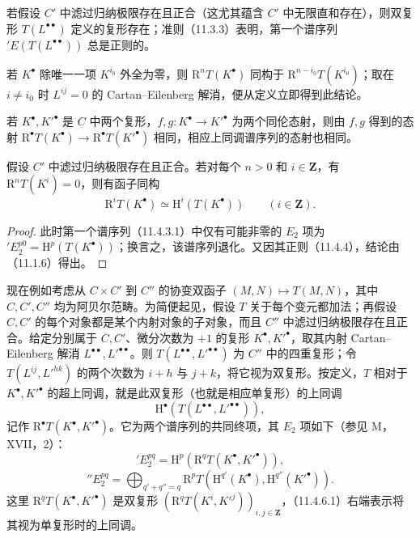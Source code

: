 若假设 $C'$ 中滤过归纳极限存在且正合（这尤其蕴含 $C'$ 中无限直和存在），则双复形 $T(L^{\bullet\bullet})$ 定义的复形存在；准则（11.3.3）表明，第一个谱序列 $'E(T(L^{\bullet\bullet}))$ 总是正则的。

若 $K^\bullet$ 除唯一一项 $K^{i_0}$ 外全为零，则 $\mathrm R^nT(K^\bullet)$ 同构于 $\mathrm R^{n-i_0}T(K^{i_0})$；取在 $i\ne i_0$ 时 $L^{ij}=0$ 的 Cartan--Eilenberg 解消，便从定义立即得到此结论。

若 $K^\bullet,K'^\bullet$ 是 $C$ 中两个复形，$f,g:K^\bullet\to K'^\bullet$ 为两个同伦态射，则由 $f,g$ 得到的态射 $\mathrm R^\bullet T(K^\bullet)\to\mathrm R^\bullet T(K'^\bullet)$ 相同，相应上同调谱序列的态射也相同。

假设 $C'$ 中滤过归纳极限存在且正合。若对每个 $n>0$ 和 $i\in\mathbf Z$，有 $\mathrm R^nT(K^i)=0$，则有函子同构
\begin{equation}\tag{11.4.5.1}
\mathrm R^iT(K^\bullet)\simeq\mathrm H^i(T(K^\bullet))\qquad(i\in\mathbf Z).
\end{equation}
\begin{proof}
此时第一个谱序列（11.4.3.1）中仅有可能非零的 $E_2$ 项为 $'E_2^{p0}=\mathrm H^p(T(K^\bullet))$；换言之，该谱序列退化。又因其正则（11.4.4），结论由（11.1.6）得出。
\end{proof}

现在例如考虑从 $C\times C'$ 到 $C''$ 的协变双函子 $(M,N)\mapsto T(M,N)$，其中 $C,C',C''$ 均为阿贝尔范畴。为简便起见，假设 $T$ 关于每个变元都加法；再假设 $C,C'$ 的每个对象都是某个内射对象的子对象，而且 $C''$ 中滤过归纳极限存在且正合。给定分别属于 $C,C'$、微分次数为 $+1$ 的复形 $K^\bullet,K'^\bullet$，取其内射 Cartan--Eilenberg 解消 $L^{\bullet\bullet},L'^{\bullet\bullet}$。则 $T(L^{\bullet\bullet},L'^{\bullet\bullet})$ 为 $C''$ 中的四重复形；令 $T(L^{ij},L'^{hk})$ 的两个次数为 $i+h$ 与 $j+k$，将它视为双复形。按定义，$T$ 相对于 $K^\bullet,K'^\bullet$ 的超上同调，就是此双复形（也就是相应单复形）的上同调
\[
\mathrm H^\bullet(T(L^{\bullet\bullet},L'^{\bullet\bullet})),
\]
记作 $\mathrm R^\bullet T(K^\bullet,K'^\bullet)$。它为两个谱序列的共同终项，其 $E_2$ 项如下（参见 M，XVII，2）：
\begin{equation}\tag{11.4.6.1}
'E_2^{pq}=\mathrm H^p(\mathrm R^qT(K^\bullet,K'^\bullet)),
\end{equation}
\begin{equation}\tag{11.4.6.2}
''E_2^{pq}=\bigoplus_{q'+q''=q}\mathrm R^pT(\mathrm H^{q'}(K^\bullet),\mathrm H^{q''}(K'^\bullet)).
\end{equation}
这里 $\mathrm R^qT(K^\bullet,K'^\bullet)$ 是双复形 $(\mathrm R^qT(K^i,K'^j))_{i,j\in\mathbf Z}$，（11.4.6.1）右端表示将其视为单复形时的上同调。


